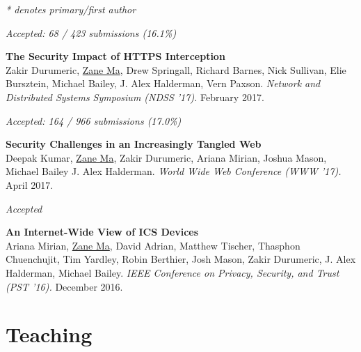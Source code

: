 \documentclass[10pt,singlecolumn]{article} %
\begin{document}
\vspace{12pt}
\textit{* denotes primary/first author}


\vspace{6pt}
{\raggedleft\textit{Accepted: 68 / 423 submissions (16.1\%)}\par}

\textbf{The Security Impact of HTTPS Interception}\\
Zakir Durumeric, \underline{Zane Ma}, Drew Springall, Richard Barnes, Nick Sullivan, Elie Bursztein, Michael
Bailey, J. Alex Halderman, Vern Paxson.
\textit{Network and Distributed Systems Symposium (NDSS '17).} February 2017.


\vspace{6pt}
{\raggedleft\textit{Accepted: 164 / 966 submissions (17.0\%)}\par}

\textbf{Security Challenges in an Increasingly Tangled Web}\\
Deepak Kumar, \underline{Zane Ma}, Zakir Durumeric, Ariana Mirian, Joshua Mason, Michael Bailey J. Alex Halderman.
\textit{World Wide Web Conference (WWW '17).} April 2017.



\vspace{6pt}
{\raggedleft\textit{Accepted}\par}

\textbf{An Internet-Wide View of ICS Devices}\\
Ariana Mirian, \underline{Zane Ma}, David Adrian, Matthew Tischer, Thasphon Chuenchujit, Tim Yardley, Robin Berthier, Josh Mason, Zakir Durumeric, J. Alex Halderman, Michael Bailey.
\textit{IEEE Conference on Privacy, Security, and Trust (PST '16).} December 2016. \\




\section{Teaching} 
\end{document}
